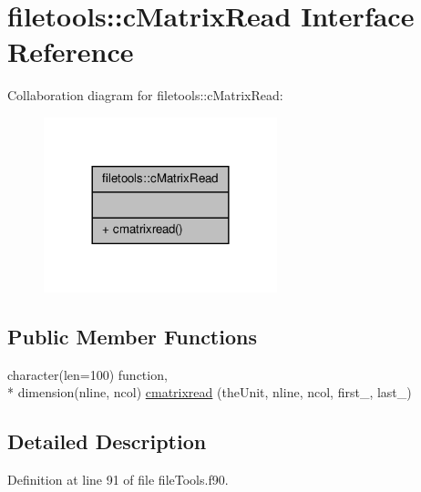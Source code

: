 \hypertarget{interfacefiletools_1_1c_matrix_read}{\section{filetools\-:\-:c\-Matrix\-Read Interface Reference}
\label{interfacefiletools_1_1c_matrix_read}
}


Collaboration diagram for filetools\-:\-:c\-Matrix\-Read\-:\nopagebreak
\begin{figure}[H]
\begin{center}
\leavevmode
\includegraphics[width=192pt]{interfacefiletools_1_1c_matrix_read__coll__graph}
\end{center}
\end{figure}
\subsection*{Public Member Functions}
\begin{DoxyCompactItemize}
\item 
character(len=100) function, \\*
dimension(nline, ncol) \hyperlink{interfacefiletools_1_1c_matrix_read_ad46208c86143112574df85f78b52bc95}{cmatrixread} (the\-Unit, nline, ncol, first\-\_\-, last\-\_\-)
\end{DoxyCompactItemize}


\subsection{Detailed Description}


Definition at line 91 of file file\-Tools.\-f90.



